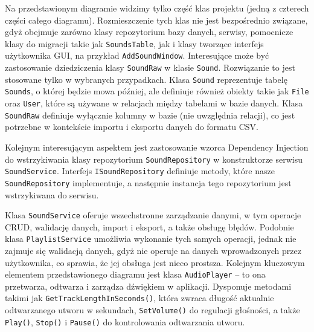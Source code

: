 {Na przedstawionym diagramie widzimy tylko część klas projektu (jedną z czterech części całego diagramu). Rozmieszczenie tych klas nie jest bezpośrednio związane, gdyż obejmuje zarówno klasy repozytorium bazy danych, serwisy, pomocnicze klasy do migracji takie jak \texttt{SoundsTable}, jak i klasy tworzące interfejs użytkownika GUI, na przykład \texttt{AddSoundWindow}. Interesujące może być zastosowanie dziedziczenia klasy \texttt{SoundRaw} w klasie \texttt{Sound}. Rozwiązanie to jest stosowane tylko w wybranych przypadkach. Klasa \texttt{Sound} reprezentuje tabelę \texttt{Sounds}, o której będzie mowa później, ale definiuje również obiekty takie jak \texttt{File} oraz \texttt{User}, które są używane w relacjach między tabelami w bazie danych. Klasa \texttt{SoundRaw} definiuje wyłącznie kolumny w bazie (nie uwzględnia relacji), co jest potrzebne w kontekście importu i eksportu danych do formatu CSV.

Kolejnym interesującym aspektem jest zastosowanie wzorca Dependency Injection do wstrzykiwania klasy repozytorium \texttt{SoundRepository} w konstruktorze serwisu \texttt{SoundService}. Interfejs \texttt{ISoundRepository} definiuje metody, które nasze \texttt{SoundRepository} implementuje, a następnie instancja tego repozytorium jest wstrzykiwana do serwisu.



Klasa \texttt{SoundService} oferuje wszechstronne zarządzanie danymi, w tym operacje CRUD, walidację danych, import i eksport, a także obsługę błędów. Podobnie klasa \texttt{PlaylistService} umożliwia wykonanie tych samych operacji, jednak nie zajmuje się walidacją danych, gdyż nie operuje na danych wprowadzonych przez użytkownika, co sprawia, że jej obsługa jest nieco prostsza. Kolejnym kluczowym elementem przedstawionego diagramu jest klasa \texttt{AudioPlayer} – to ona przetwarza, odtwarza i zarządza dźwiękiem w aplikacji. Dysponuje metodami takimi jak \texttt{GetTrackLengthInSeconds()}, która zwraca długość aktualnie odtwarzanego utworu w sekundach, \texttt{SetVolume()} do regulacji głośności, a także \texttt{Play()}, \texttt{Stop()} i \texttt{Pause()} do kontrolowania odtwarzania utworu.
}

